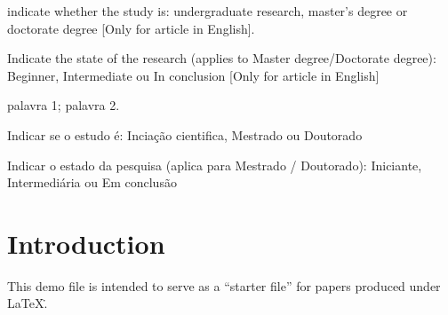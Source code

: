 \documentclass[conference]{IEEEtran}
\begin{document}
\renewcommand\IEEEkeywordsname{Classification}
\begin{IEEEkeywords}
	\label{Classification}
	indicate whether the study is: undergraduate research, master's degree or doctorate degree [Only for article in English].
\end{IEEEkeywords}
\renewcommand\IEEEkeywordsname{Category}
\begin{IEEEkeywords}
	\label{Category}
	Indicate the state of the research (applies to Master degree/Doctorate degree): 
	Beginner, Intermediate ou In conclusion [Only for article in English] 
\end{IEEEkeywords}
\renewcommand{\abstractname}{Resumo}
\begin{abstract}
\label{Resumo}
Resumo aqui para documento em Portugu\^{e}s.
\end{abstract}

\renewcommand\IEEEkeywordsname{Palavras-chave}
\begin{IEEEkeywords}
\label{Palavras-chave}
palavra 1; palavra 2.
\end{IEEEkeywords}

\renewcommand\IEEEkeywordsname{Classifica\c{c}\~{a}o}
\begin{IEEEkeywords}
	\label{classificacao}
	Indicar se o estudo \'{e}: Incia\c{c}\~{a}o cientifica, Mestrado ou Doutorado
\end{IEEEkeywords}

\renewcommand\IEEEkeywordsname{Categoria}
\begin{IEEEkeywords}
	\label{Categoria}
	Indicar o estado da pesquisa (aplica para Mestrado / Doutorado): 
 	Iniciante, Intermedi\'{a}ria ou Em conclus\~{a}o 
\end{IEEEkeywords}
%
\IEEEpeerreviewmaketitle



\section{Introduction}
This demo file is intended to serve as a ``starter file''
for papers produced under \LaTeX\..
\end{document}
